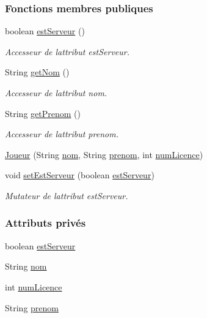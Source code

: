 \subsubsection*{Fonctions membres publiques}
\begin{DoxyCompactItemize}
\item 
boolean \hyperlink{classcom_1_1example_1_1area_1_1_joueur_ad35bff2a14331bada30ccc164d25f50f}{est\+Serveur} ()
\begin{DoxyCompactList}\small\item\em Accesseur de l\textquotesingle{}attribut est\+Serveur. \end{DoxyCompactList}\item 
String \hyperlink{classcom_1_1example_1_1area_1_1_joueur_a4e43a9187363501204af7b2f2c84a9a4}{get\+Nom} ()
\begin{DoxyCompactList}\small\item\em Accesseur de l\textquotesingle{}attribut nom. \end{DoxyCompactList}\item 
String \hyperlink{classcom_1_1example_1_1area_1_1_joueur_ac2cd099ccfc34c48fbabde5649514a27}{get\+Prenom} ()
\begin{DoxyCompactList}\small\item\em Accesseur de l\textquotesingle{}attribut prenom. \end{DoxyCompactList}\item 
\hyperlink{classcom_1_1example_1_1area_1_1_joueur_a62953f37425da88ba6e6e2426ab67afc}{Joueur} (String \hyperlink{classcom_1_1example_1_1area_1_1_joueur_a98dde75942f6a48d9acf0abb67742dc3}{nom}, String \hyperlink{classcom_1_1example_1_1area_1_1_joueur_a9a49f14719dfc48cf557ef8677e2b2bc}{prenom}, int \hyperlink{classcom_1_1example_1_1area_1_1_joueur_a559bd07d0a47e8fc1ec3050890f00589}{num\+Licence})
\item 
void \hyperlink{classcom_1_1example_1_1area_1_1_joueur_aa0ae3b52616cc034cd6270eade9a1be7}{set\+Est\+Serveur} (boolean \hyperlink{classcom_1_1example_1_1area_1_1_joueur_abbc3e85c6740569af7f1bd2cb7aad6a2}{est\+Serveur})
\begin{DoxyCompactList}\small\item\em Mutateur de l\textquotesingle{}attribut est\+Serveur. \end{DoxyCompactList}\end{DoxyCompactItemize}
\subsubsection*{Attributs privés}
\begin{DoxyCompactItemize}
\item 
boolean \hyperlink{classcom_1_1example_1_1area_1_1_joueur_abbc3e85c6740569af7f1bd2cb7aad6a2}{est\+Serveur}
\item 
String \hyperlink{classcom_1_1example_1_1area_1_1_joueur_a98dde75942f6a48d9acf0abb67742dc3}{nom}
\item 
int \hyperlink{classcom_1_1example_1_1area_1_1_joueur_a559bd07d0a47e8fc1ec3050890f00589}{num\+Licence}
\item 
String \hyperlink{classcom_1_1example_1_1area_1_1_joueur_a9a49f14719dfc48cf557ef8677e2b2bc}{prenom}
\end{DoxyCompactItemize}


